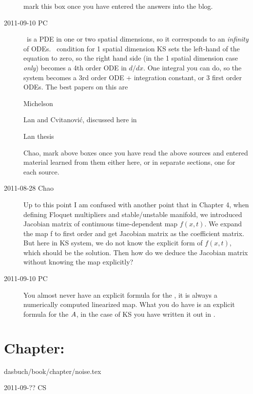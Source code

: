 \begin{description}
 mark this box once you have entered the
answers into the blog.

\item[2011-09-10 PC]
\KSe\ is a PDE in one or two spatial dimensions, so it corresponds to an
\emph{infinity} of ODEs. \Eqv\ condition for 1 spatial dimension KS sets
the left-hand of the equation to zero, so the right hand side (in the 1
spatial dimension case \emph{only}) becomes a 4th order ODE in $d/dx$.
One integral you can do, so the system becomes a 3rd order ODE +
integration constant, or 3 first order ODEs. The best papers on this are

\noindent
[ ] Michelson

\noindent
[ ] Lan and Cvitanovi{\'c}, discussed here in

\noindent
[ ] Lan thesis

\noindent
Chao, mark above boxes once you have read the above sources and entered
material learned from them either here, or in separate sections, one for
each source.

\item[2011-08-28 Chao]
Up to this point I am confused with another point that in Chapter 4, when
defining Floquet multipliers and stable/unstable manifold, we
introduced Jacobian matrix of continuous time-dependent map $f(x,t)$. We
expand the map f to first order and get Jacobian matrix as the
coefficient matrix. But here in KS system, we do not know the explicit
form of $f(x,t)$, which should be the solution. Then how do we deduce the
Jacobian matrix without knowing the map explicitly?

\item[2011-09-10 PC] You almost never have an explicit formula for the
\JacobianM, it is always a numerically computed linearized map. What you
do have is an explicit formula for the {\stabmat} ${A}$, in the case
of KS you have written it out in .

\end{description}

\section{Chapter: }\noindent dasbuch/book/chapter/noise.tex
\begin{description}\item[2011-09-?? CS]

\end{description}

